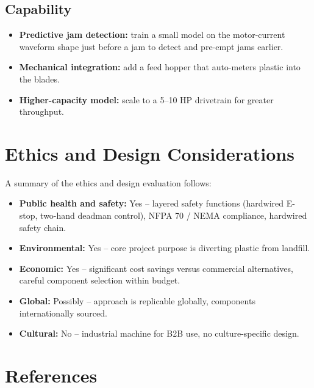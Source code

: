 \documentclass[hidelinks,12pt]{article}
\begin{document}
\subsection{Capability}
\begin{itemize}
    \item \textbf{Predictive jam detection:} train a small model on the motor-current waveform shape just before a jam to detect and pre-empt jams earlier.
    \item \textbf{Mechanical integration:} add a feed hopper that auto-meters plastic into the blades.
    \item \textbf{Higher-capacity model:} scale to a 5--10 HP drivetrain for greater throughput.
\end{itemize}

\section{Ethics and Design Considerations}

A summary of the ethics and design evaluation follows:

\begin{itemize}
    \item \textbf{Public health and safety:} Yes -- layered safety functions (hardwired E-stop, two-hand deadman control), NFPA 70 / NEMA compliance, hardwired safety chain.
    \item \textbf{Environmental:} Yes -- core project purpose is diverting plastic from landfill.
    \item \textbf{Economic:} Yes -- significant cost savings versus commercial alternatives, careful component selection within budget.
    \item \textbf{Global:} Possibly -- approach is replicable globally, components internationally sourced.
    \item \textbf{Cultural:} No -- industrial machine for B2B use, no culture-specific design.
\end{itemize}

\section{References}
\end{document}
